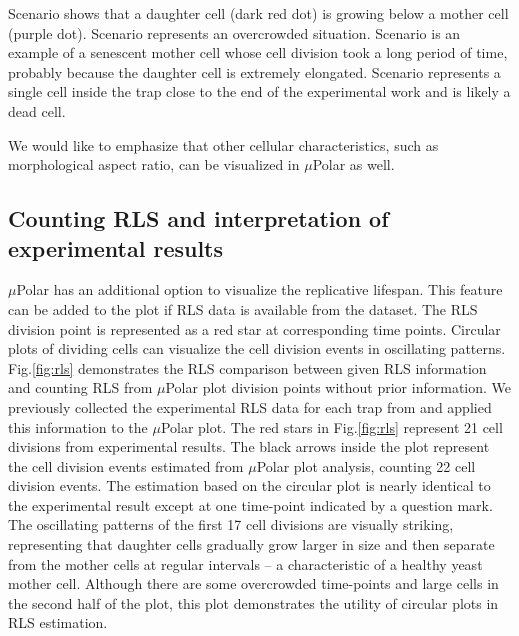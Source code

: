\documentclass[conference]{IEEEtran}
\begin{document}
Scenario  shows that a daughter cell (dark red dot) is growing below a mother cell (purple dot). 
Scenario  represents an overcrowded situation. 
Scenario  is an example of a senescent mother cell whose cell division took a long period of time, probably because the daughter cell is extremely elongated.
Scenario  represents a single cell inside the trap close to the end of the experimental work and is likely a dead cell. 

We would like to emphasize that other cellular characteristics, such as morphological aspect ratio, can be visualized in $\mu$Polar as well. 

\subsection{Counting RLS and interpretation of experimental results}
$\mu$Polar has an additional option to visualize the replicative lifespan. This feature can be added to the plot if RLS data is available from the dataset. The RLS division point is represented as a red star at corresponding time points.  
Circular plots of dividing cells can visualize the cell division events in oscillating patterns.  Fig.\ref{fig:rls} demonstrates the RLS comparison between given RLS information and counting RLS from $\mu$Polar plot division points without prior information. We previously collected the experimental RLS data for each trap from \cite{r13} and applied this information to the $\mu$Polar plot. The red stars in Fig.\ref{fig:rls} represent 21 cell divisions from experimental results. The black arrows inside the plot represent the cell division events estimated from $\mu$Polar plot analysis, counting 22 cell division events. 
The estimation based on the circular plot is nearly identical to the experimental result except at one time-point indicated by a question mark. 
The oscillating patterns of the first 17 cell divisions are visually striking, representing that daughter cells gradually grow larger in size and then separate from the mother cells at regular intervals -- a characteristic of a healthy yeast mother cell. 
Although there are some overcrowded time-points and large cells in the second half of the plot, this plot demonstrates the utility of circular plots in RLS estimation. 
\end{document}
